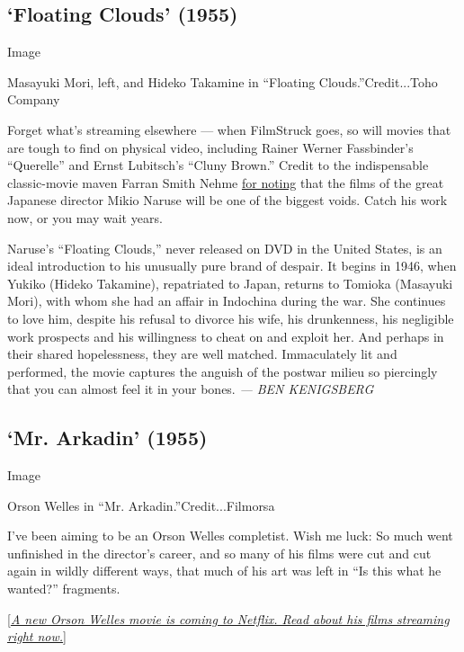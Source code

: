 \hypertarget{floating-clouds-1955}{%
\subsection{`Floating Clouds' (1955)}\label{floating-clouds-1955}}

Image

Masayuki Mori, left, and Hideko Takamine in ``Floating
Clouds.''Credit...Toho Company

Forget what's streaming elsewhere --- when FilmStruck goes, so will
movies that are tough to find on physical video, including Rainer Werner
Fassbinder's ``Querelle'' and Ernst Lubitsch's ``Cluny Brown.'' Credit
to the indispensable classic-movie maven Farran Smith Nehme
\href{https://twitter.com/selfstyledsiren/status/1055844790049427456}{for
noting} that the films of the great Japanese director Mikio Naruse will
be one of the biggest voids. Catch his work now, or you may wait years.

Naruse's ``Floating Clouds,'' never released on DVD in the United
States, is an ideal introduction to his unusually pure brand of despair.
It begins in 1946, when Yukiko (Hideko Takamine), repatriated to Japan,
returns to Tomioka (Masayuki Mori), with whom she had an affair in
Indochina during the war. She continues to love him, despite his refusal
to divorce his wife, his drunkenness, his negligible work prospects and
his willingness to cheat on and exploit her. And perhaps in their shared
hopelessness, they are well matched. Immaculately lit and performed, the
movie captures the anguish of the postwar milieu so piercingly that you
can almost feel it in your bones. \emph{--- BEN KENIGSBERG}

\hypertarget{mr-arkadin-1955}{%
\subsection{`Mr. Arkadin' (1955)}\label{mr-arkadin-1955}}

Image

Orson Welles in ``Mr. Arkadin.''Credit...Filmorsa

I've been aiming to be an Orson Welles completist. Wish me luck: So much
went unfinished in the director's career, and so many of his films were
cut and cut again in wildly different ways, that much of his art was
left in ``Is this what he wanted?'' fragments.

{[}\href{https://www.nytimes3xbfgragh.onion/2018/10/31/movies/orson-welles-netflix.html}{\emph{A
new Orson Welles movie is coming to Netflix. Read about his films
streaming right now.}}{]}

